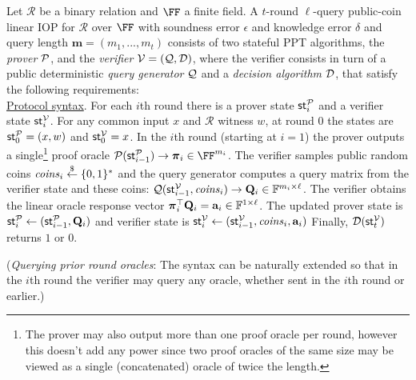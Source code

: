 \begin{definition} 
\label{def:linearIOP}
Let $\mathcal{R}$ be a binary relation and $\FF$ a finite field. A $t$-round $\ell$-query public-coin linear IOP for $\mathcal{R}$ over $\FF$ with soundness error $\epsilon$ and knowledge error $\delta$ and query length $\mathbf{m} = (m_1,...,m_t)$ consists of two stateful PPT algorithms, the \emph{prover} $\mathcal{P}$, and the
\emph{verifier} $\mathcal{V} = (\mathcal{Q}, \mathcal{D})$, where the verifier consists in turn of a public deterministic \emph{query generator} $\mathcal{Q}$ and a
\emph{decision algorithm} $\mathcal{D}$, that satisfy the following requirements:\\
 
\noindent \underline{Protocol syntax}. 
For each $i$th round there is a prover state $\textsf{st}^\mathcal{P}_i$ and a verifier state $\textsf{st}^\mathcal{V}_i$. For any common input $x$ and $\mathcal{R}$ witness $w$, at round 0 the states are $\textsf{st}^\mathcal{P}_0 = (x, w)$ and $\textsf{st}^\mathcal{V}_0 = x$. 
In the $i$th round (starting at $i = 1$) the prover outputs a single\footnote{The prover may also output more than one proof oracle per round, however this doesn't add any power since two proof oracles of the same size may be viewed as a single (concatenated) oracle of twice the length.} proof oracle $\prover(\textsf{st}^\prover_{i-1}) \rightarrow \proofO_i \in \FF^{m_i}$. The verifier samples public random coins $\mathit{coins}_i \overset{\$}{\gets} \{0,1\}^*$ and the query generator computes a query matrix from the verifier state and these coins: $\mathcal{Q}(\textsf{st}^\mathcal{V}_{i-1}, \mathit{coins}_i) \rightarrow \mathbf{Q}_i \in \mathbb{F}^{m_i \times \ell}$. The verifier obtains the linear oracle response vector $\boldsymbol{\pi}_i^\top \mathbf{Q}_i = \mathbf{a}_i \in \mathbb{F}^{1 \times \ell}$. The updated prover state is $\textsf{st}^\mathcal{P}_i \leftarrow (\textsf{st}^\mathcal{P}_{i-1}, \mathbf{Q}_i)$
and verifier state is $\textsf{st}^\mathcal{V}_i \leftarrow (\textsf{st}^\mathcal{V}_{i-1}, \mathit{coins}_i, \mathbf{a}_i)$
Finally, $\mathcal{D}(\textsf{st}^\mathcal{V}_t)$ returns $1$ or $0$. 

(\emph{Querying prior round oracles}: The syntax can be naturally extended so that in the $i$th round the verifier may query any oracle, whether sent in the $i$th round or earlier.) \\ 



\end{definition}

